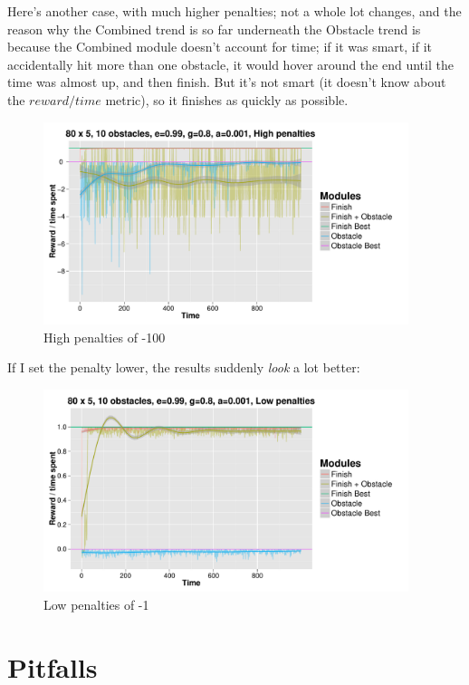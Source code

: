 \documentclass[11pt]{report}
\begin{document}
Here's another case, with much higher penalties; not a whole lot changes, and the reason why the Combined trend is so far underneath the Obstacle trend is because the Combined module doesn't account for time; if it was smart, if it accidentally hit more than one obstacle, it would hover around the end until the time was almost up, and then finish. But it's not smart (it doesn't know about the $reward / time$ metric), so it finishes as quickly as possible.

\begin{figure}[H]
  \centering
  \includegraphics[width=0.95\textwidth]{results/qlearn-s80x5-o10-e0-99-a0-001-g0-8-high.pdf}
  \caption{High penalties of -100}
\end{figure}

If I set the penalty lower, the results suddenly \emph{look} a lot better:

\begin{figure}[H]
  \centering
  \includegraphics[width=0.95\textwidth]{results/qlearn-s80x5-o10-e0-99-a0-001-g0-8-low.pdf}
  \caption{Low penalties of -1}
\end{figure}



\section{Pitfalls}
\end{document}
